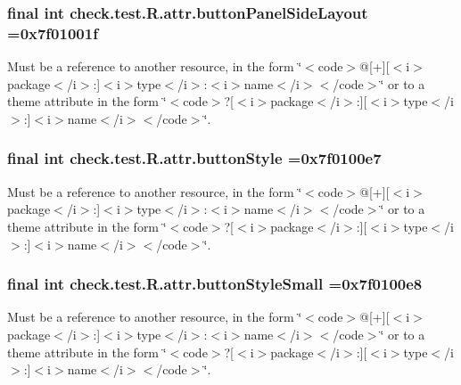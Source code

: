 \subsubsection[{button\+Panel\+Side\+Layout}]{\setlength{\rightskip}{0pt plus 5cm}final int check.\+test.\+R.\+attr.\+button\+Panel\+Side\+Layout =0x7f01001f\hspace{0.3cm}{\ttfamily [static]}}\label{classcheck_1_1test_1_1_r_1_1attr_a32cad5c610a0ee38f68d1a530b5e5714}
Must be a reference to another resource, in the form \char`\"{}$<$code$>$@\mbox{[}+\mbox{]}\mbox{[}$<$i$>$package$<$/i$>$\+:\mbox{]}$<$i$>$type$<$/i$>$\+:$<$i$>$name$<$/i$>$$<$/code$>$\char`\"{} or to a theme attribute in the form \char`\"{}$<$code$>$?\mbox{[}$<$i$>$package$<$/i$>$\+:\mbox{]}\mbox{[}$<$i$>$type$<$/i$>$\+:\mbox{]}$<$i$>$name$<$/i$>$$<$/code$>$\char`\"{}. \hypertarget{classcheck_1_1test_1_1_r_1_1attr_aeed7bf89db114a56c67e851d7bc203e4}{}
\subsubsection[{button\+Style}]{\setlength{\rightskip}{0pt plus 5cm}final int check.\+test.\+R.\+attr.\+button\+Style =0x7f0100e7\hspace{0.3cm}{\ttfamily [static]}}\label{classcheck_1_1test_1_1_r_1_1attr_aeed7bf89db114a56c67e851d7bc203e4}
Must be a reference to another resource, in the form \char`\"{}$<$code$>$@\mbox{[}+\mbox{]}\mbox{[}$<$i$>$package$<$/i$>$\+:\mbox{]}$<$i$>$type$<$/i$>$\+:$<$i$>$name$<$/i$>$$<$/code$>$\char`\"{} or to a theme attribute in the form \char`\"{}$<$code$>$?\mbox{[}$<$i$>$package$<$/i$>$\+:\mbox{]}\mbox{[}$<$i$>$type$<$/i$>$\+:\mbox{]}$<$i$>$name$<$/i$>$$<$/code$>$\char`\"{}. \hypertarget{classcheck_1_1test_1_1_r_1_1attr_ab3ed13cf9d84ee968fa956ca93671a59}{}
\subsubsection[{button\+Style\+Small}]{\setlength{\rightskip}{0pt plus 5cm}final int check.\+test.\+R.\+attr.\+button\+Style\+Small =0x7f0100e8\hspace{0.3cm}{\ttfamily [static]}}\label{classcheck_1_1test_1_1_r_1_1attr_ab3ed13cf9d84ee968fa956ca93671a59}
Must be a reference to another resource, in the form \char`\"{}$<$code$>$@\mbox{[}+\mbox{]}\mbox{[}$<$i$>$package$<$/i$>$\+:\mbox{]}$<$i$>$type$<$/i$>$\+:$<$i$>$name$<$/i$>$$<$/code$>$\char`\"{} or to a theme attribute in the form \char`\"{}$<$code$>$?\mbox{[}$<$i$>$package$<$/i$>$\+:\mbox{]}\mbox{[}$<$i$>$type$<$/i$>$\+:\mbox{]}$<$i$>$name$<$/i$>$$<$/code$>$\char`\"{}. \hypertarget{classcheck_1_1test_1_1_r_1_1attr_ae0edaceba06f9362a37080dd1f7d7822}{}
